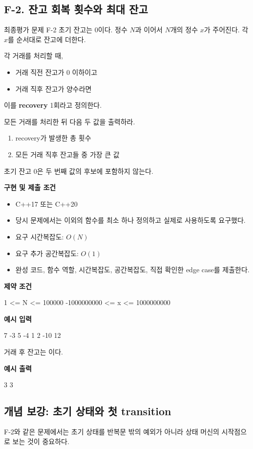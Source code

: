 \subsection{F-2. 잔고 회복 횟수와 최대 잔고}
\begin{problembox}{최종평가 문제 F-2}
초기 잔고는 0이다. 정수 $N$과 이어서 $N$개의 정수 $x$가 주어진다. 각 $x$를 순서대로 잔고에 더한다.

각 거래를 처리할 때,
\begin{itemize}
  \item 거래 직전 잔고가 0 이하이고
  \item 거래 직후 잔고가 양수라면
\end{itemize}
이를 \textbf{recovery} 1회라고 정의한다.

모든 거래를 처리한 뒤 다음 두 값을 출력하라.
\begin{enumerate}
  \item recovery가 발생한 총 횟수
  \item 모든 거래 직후 잔고들 중 가장 큰 값
\end{enumerate}
초기 잔고 0은 두 번째 값의 후보에 포함하지 않는다.

\textbf{구현 및 제출 조건}
\begin{itemize}
  \item C++17 또는 C++20
  \item 당시 문제에서는  이외의 함수를 최소 하나 정의하고 실제로 사용하도록 요구했다.
  \item 요구 시간복잡도: $O(N)$
  \item 요구 추가 공간복잡도: $O(1)$
  \item 완성 코드, 함수 역할, 시간복잡도, 공간복잡도, 직접 확인한 edge case를 제출한다.
\end{itemize}

\textbf{제약 조건}
\begin{TextBlock}
1 <= N <= 100000
-1000000000 <= x <= 1000000000
\end{TextBlock}

\textbf{예시 입력}
\begin{TextBlock}
7
-3 5 -4 1 2 -10 12
\end{TextBlock}

거래 후 잔고는 이다.

\textbf{예시 출력}
\begin{TextBlock}
3 3
\end{TextBlock}
\end{problembox}

\subsection{개념 보강: 초기 상태와 첫 transition}
F-2와 같은 문제에서는 초기 상태를 반복문 밖의 예외가 아니라 상태 머신의 시작점으로 보는 것이 중요하다.

